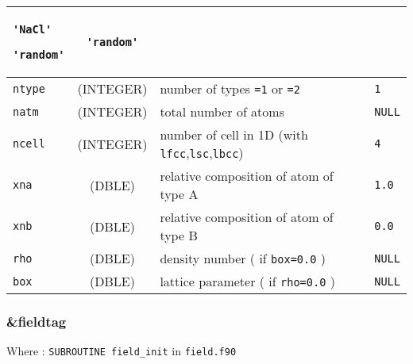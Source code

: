 \documentclass[a4paper]{article}
\begin{document}
\begin{longtable}{l|c|m{8cm}|m{2cm}}
	                              \verb?'NaCl'? \newline
				      
				      \verb?'random'? \newline                                                              & \verb?'random'? \tabularnewline
\hline
\rule[-0.75cm]{0cm}{1.5cm}
\verb?ntype?     & (INTEGER)         & number of types \verb?=1? or \verb?=2?                                               & \verb?1? \\
\hline
\rule[-0.75cm]{0cm}{1.5cm}
\verb?natm?      & (INTEGER)         & total number of atoms                                                                & \verb?NULL? \\
\hline
\rule[-0.75cm]{0cm}{1.5cm}
\verb?ncell?     & (INTEGER)         & number of cell in 1D (with \verb?lfcc?,\verb?lsc?,\verb?lbcc?)                       & \verb?4? \\
\hline
\rule[-0.75cm]{0cm}{1.5cm}
\verb?xna?       & (DBLE)            & relative composition of atom of type A                                               & \verb?1.0? \\
\hline
\rule[-0.75cm]{0cm}{1.5cm}
\verb?xnb?       & (DBLE)            & relative composition of atom of type B                                               & \verb?0.0? \\
\hline
\rule[-0.75cm]{0cm}{1.5cm}
\verb?rho?       & (DBLE)            & density number ( if \verb?box=0.0? )                                                 & \verb?NULL? \\
\hline
\rule[-0.75cm]{0cm}{1.5cm}
\verb?box?       & (DBLE)            & lattice parameter ( if \verb?rho=0.0? )                                              & \verb?NULL? \\
\hline
\hline
\hline
\end{longtable}


\subsubsection{\&fieldtag}

Where : \verb?SUBROUTINE field_init? in \verb?field.f90?
\newline
\end{document}
